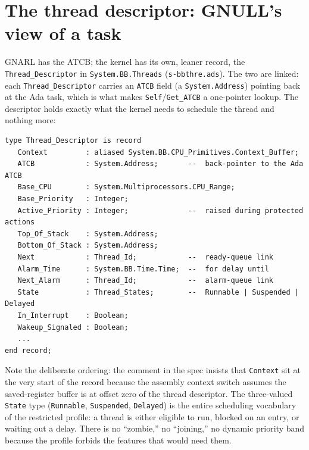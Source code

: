 \section{The thread descriptor: GNULL's view of a task}

GNARL has the ATCB; the kernel has its own, leaner record, the
\texttt{Thread\_Descriptor} in \texttt{System.BB.Threads} (\texttt{s-bbthre.ads}).
The two are linked: each \texttt{Thread\_Descriptor} carries an \texttt{ATCB}
field (a \texttt{System.Address}) pointing back at the Ada task, which is what
makes \texttt{Self}/\texttt{Get\_ATCB} a one-pointer lookup. The descriptor holds
exactly what the kernel needs to schedule the thread and nothing more:

\begin{lstlisting}
type Thread_Descriptor is record
   Context         : aliased System.BB.CPU_Primitives.Context_Buffer;
   ATCB            : System.Address;       --  back-pointer to the Ada ATCB
   Base_CPU        : System.Multiprocessors.CPU_Range;
   Base_Priority   : Integer;
   Active_Priority : Integer;              --  raised during protected actions
   Top_Of_Stack    : System.Address;
   Bottom_Of_Stack : System.Address;
   Next            : Thread_Id;            --  ready-queue link
   Alarm_Time      : System.BB.Time.Time;  --  for delay until
   Next_Alarm      : Thread_Id;            --  alarm-queue link
   State           : Thread_States;        --  Runnable | Suspended | Delayed
   In_Interrupt    : Boolean;
   Wakeup_Signaled : Boolean;
   ...
end record;
\end{lstlisting}

Note the deliberate ordering: the comment in the spec insists that
\texttt{Context} sit at the very start of the record because the assembly
context switch assumes the saved-register buffer is at offset zero of the thread
descriptor. The three-valued \texttt{State} type (\texttt{Runnable},
\texttt{Suspended}, \texttt{Delayed}) is the entire scheduling vocabulary of
the restricted profile: a thread is either eligible to run, blocked on an entry,
or waiting out a delay. There is no ``zombie,'' no ``joining,'' no dynamic
priority band because the profile forbids the features that would need them.

